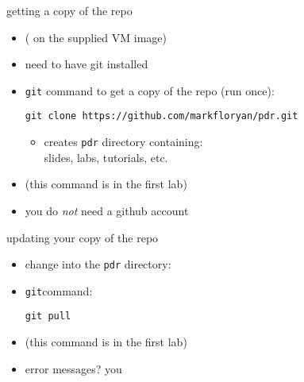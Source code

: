 \begin{frame}[fragile,label=repoCopy]{getting a copy of the repo}
    \begin{itemize}
        \item ( on the supplied VM image)
        \item need to have git installed
        \item {\tt git} command to get a copy of the repo (run once): \\
\begin{framed}
\begin{lstlisting}[language={},basicstyle=\sourcecodepro\fontsize{13}{14}\selectfont]
git clone https://github.com/markfloryan/pdr.git
\end{lstlisting}
\end{framed}
            \begin{itemize}
                \item creates {\tt pdr} directory containing: \\
                        slides, labs, tutorials, etc.
            \end{itemize}
        \item (this command is in the first lab)
        \item you do \textit{not} need a github account
    \end{itemize}
\end{frame}

\begin{frame}{updating your copy of the repo}
    \begin{itemize}
        \item change into the {\tt pdr} directory: \\
        \item {\tt git}command: \\ \begin{framed}{\tt git pull}\end{framed}
        \item (this command is in the first lab)
        \item error messages? you 
    \end{itemize}
\end{frame}

